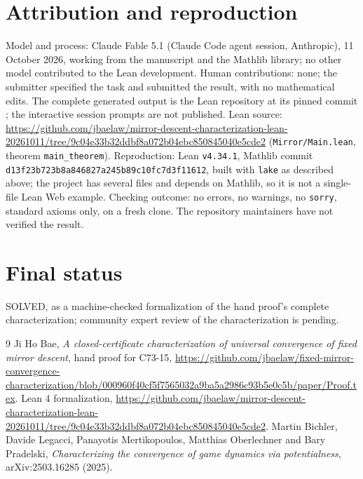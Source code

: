 \documentclass[11pt]{article}
\theoremstyle{definition}
\begin{document}
\section*{Attribution and reproduction}
Model and process: Claude Fable 5.1 (Claude Code agent session, Anthropic), 11 October 2026, working from the manuscript \cite{Hand} and the Mathlib library; no other model contributed to the Lean development. Human contributions: none; the submitter specified the task and submitted the result, with no mathematical edits. The complete generated output is the Lean repository at its pinned commit \cite{Lean}; the interactive session prompts are not published. Lean source: \url{https://github.com/jbaelaw/mirror-descent-characterization-lean-20261011/tree/9c04e33b32ddbf8a072b04ebc850845040e5cde2} (\texttt{Mirror/Main.lean}, theorem \texttt{main\_theorem}). Reproduction: Lean \texttt{v4.34.1}, Mathlib commit \texttt{d13f23b723b8a846827a245b89c10fc7d3f11612}, built with \texttt{lake} as described above; the project has several files and depends on Mathlib, so it is not a single-file Lean Web example. Checking outcome: no errors, no warnings, no \texttt{sorry}, standard axioms only, on a fresh clone. The repository maintainers have not verified the result.

\section*{Final status}
SOLVED, as a machine-checked formalization of the hand proof's complete characterization; community expert review of the characterization is pending.

\begin{thebibliography}{9}
 Ji Ho Bae, \emph{A closed-certificate characterization of universal convergence of fixed mirror descent}, hand proof for C73-15, \url{https://github.com/jbaelaw/fixed-mirror-convergence-characterization/blob/000960f40cf5f7565032a9ba5a2986c93b5e0c5b/paper/Proof.tex}.
 Lean 4 formalization, \url{https://github.com/jbaelaw/mirror-descent-characterization-lean-20261011/tree/9c04e33b32ddbf8a072b04ebc850845040e5cde2}.
 Martin Bichler, Davide Legacci, Panayotis Mertikopoulos, Matthias Oberlechner and Bary Pradelski, \emph{Characterizing the convergence of game dynamics via potentialness}, arXiv:2503.16285 (2025).
\end{thebibliography}
\end{document}

